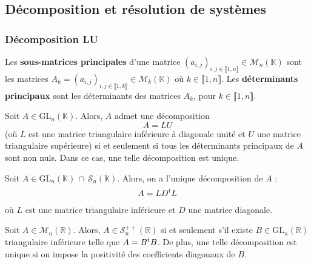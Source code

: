   \subsection{Décomposition et résolution de systèmes}
  
  \subsubsection{Décomposition LU}
  
  
  \begin{definition}
    Les \textbf{sous-matrices principales} d'une matrice $(a_{i,j})_{i,j \in \llbracket 1, n \rrbracket} \in \mathcal{M}_n(\mathbb{K})$ sont les matrices $A_k = (a_{i,j})_{i,j \in \llbracket 1, k \rrbracket} \in \mathcal{M}_k(\mathbb{K})$ où $k \in \llbracket 1, n \rrbracket$. Les \textbf{déterminants principaux} sont les déterminants des matrices $A_k$, pour $k \in \llbracket 1, n \rrbracket$.
  \end{definition}
  
  \begin{theorem}
    \label{154-2}
    Soit $A \in \mathrm{GL}_n(\mathbb{K})$. Alors, $A$ admet une décomposition
    \[ A = LU \]
    (où $L$ est une matrice triangulaire inférieure à diagonale unité et $U$ une matrice triangulaire supérieure) si et seulement si tous les déterminants principaux de $A$ sont non nuls. Dans ce cas, une telle décomposition est unique.
  \end{theorem}
  
  \begin{corollary}
    Soit $A \in \mathrm{GL}_n(\mathbb{K}) \, \cap \, \mathcal{S}_n(\mathbb{K})$. Alors, on a l'unique décomposition de $A$ :
    \[ A = LD\mathstrut ^t L \]
    où $L$ est une matrice triangulaire inférieure et $D$ une matrice diagonale.
  \end{corollary}
  
  \begin{application}
    Soit $A \in \mathcal{M}_n(\mathbb{R})$. Alors, $A \in \mathcal{S}_n^{++}(\mathbb{R})$ si et seulement s'il existe $B \in \mathrm{GL}_n(\mathbb{R})$ triangulaire inférieure telle que $A = B\mathstrut ^t B$. De plus, une telle décomposition est unique si on impose la positivité des coefficients diagonaux de $B$.
  \end{application}
  
  
